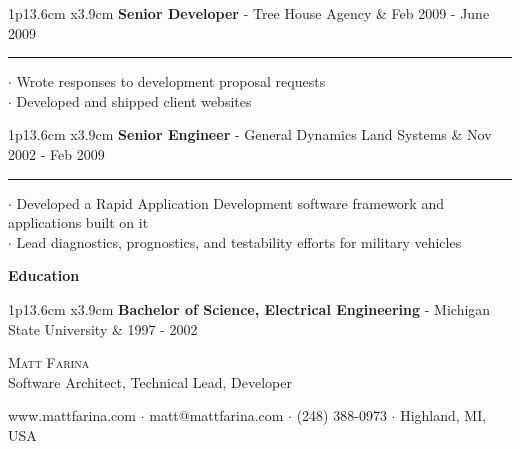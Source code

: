 \documentclass[10pt,A4]{article}
\newcommand{\cvsection}[1]
{
	\begin{center}
		\large\textcolor{sectcol}{\textbf{#1}}
	\end{center}
}
\newcommand{\cvevent}[5]
{

\begin{tabular*}{1\textwidth}{p{13.6cm}  x{3.9cm}}
	\textbf{#2} - \textcolor{bgcol}{#3} &   \vspace{2.5pt}\textcolor{sectcol}{#1}
\end{tabular*}

\vspace{-8pt}
\textcolor{softcol}{\hrule}
\vspace{6pt}

  $\cdot$ #4\\[3pt]
  $\cdot$ #5\\[6pt]

}
\newcommand{\cveventzero}[3]
{

\begin{tabular*}{1\textwidth}{p{13.6cm}  x{3.9cm}}
	\textbf{#2} - \textcolor{bgcol}{#3} &   \vspace{2.5pt}\textcolor{sectcol}{#1}
\end{tabular*}

\vspace{-8pt}
\vspace{6pt}

}
\newcommand{\mystrut}{\rule[-.3\baselineskip]{0pt}{\baselineskip}}
\begin{document}

%
\cvevent{Feb 2009 - June 2009}{Senior Developer}{Tree House Agency}{Wrote responses to development proposal requests}{Developed and shipped client websites}



%
\cvevent{Nov 2002 - Feb 2009}{Senior Engineer}{General Dynamics Land Systems}{Developed a Rapid Application Development software framework and applications built on it}{Lead diagnostics, prognostics, and testability efforts for military vehicles}

\cvsection{Education}

%
\cveventzero{1997 - 2002}{Bachelor of Science, Electrical Engineering}{Michigan State University}



\newpage

\vspace{-8pt}
\begin{center}
	\HUGE \textsc{Matt Farina}\\[2pt]
	\small Software Architect, Technical Lead, Developer
\end{center}

\begin{center}
	\small \textcolor{bgcol}{www.mattfarina.com $\cdot$ matt@mattfarina.com $\cdot$ (248) 388-0973 $\cdot$ Highland, MI, USA}
\end{center}
\end{document}
